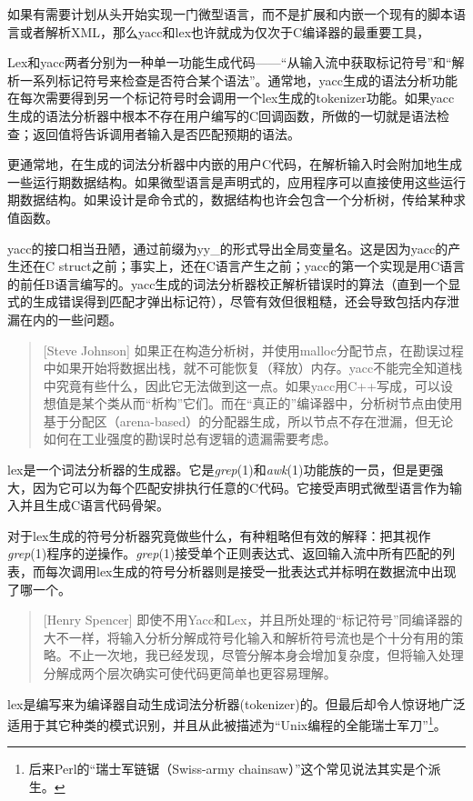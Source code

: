 \documentclass[12pt,oneside]{book}
\begin{document}
如果有需要计划从头开始实现一门微型语言，而不是扩展和内嵌一个现有的脚本语言或者解析XML，那么yacc和lex也许就成为仅次于C编译器的最重要工具，

Lex和yacc两者分别为一种单一功能生成代码——“从输入流中获取标记符号”和“解析一系列标记符号来检查是否符合某个语法”。通常地，yacc生成的语法分析功能在每次需要得到另一个标记符号时会调用一个lex生成的tokenizer功能。如果yacc生成的语法分析器中根本不存在用户编写的C回调函数，所做的一切就是语法检查；返回值将告诉调用者输入是否匹配预期的语法。

更通常地，在生成的词法分析器中内嵌的用户C代码，在解析输入时会附加地生成一些运行期数据结构。如果微型语言是声明式的，应用程序可以直接使用这些运行期数据结构。如果设计是命令式的，数据结构也许会包含一个分析树，传给某种求值函数。

yacc的接口相当丑陋，通过前缀为yy\_{}的形式导出全局变量名。这是因为yacc的产生还在C struct之前；事实上，还在C语言产生之前；yacc的第一个实现是用C语言的前任B语言编写的。yacc生成的词法分析器校正解析错误时的算法（直到一个显式的生成错误得到匹配才弹出标记符），尽管有效但很粗糙，还会导致包括内存泄漏在内的一些问题。

\begin{quote}[Steve Johnson]
如果正在构造分析树，并使用malloc分配节点，在勘误过程中如果开始将数据出栈，就不可能恢复（释放）内存。yacc不能完全知道栈中究竟有些什么，因此它无法做到这一点。如果yacc用C++写成，可以设想值是某个类从而“析构”它们。而在“真正的”编译器中，分析树节点由使用基于分配区（arena-based）的分配器生成，所以节点不存在泄漏，但无论如何在工业强度的勘误时总有逻辑的遗漏需要考虑。
\end{quote}

lex是一个词法分析器的生成器。它是\textit{grep}(1)和\textit{awk}(1)功能族的一员，但是更强大，因为它可以为每个匹配安排执行任意的C代码。它接受声明式微型语言作为输入并且生成C语言代码骨架。

对于lex生成的符号分析器究竟做些什么，有种粗略但有效的解释：把其视作\textit{grep}(1)程序的逆操作。\textit{grep}(1)接受单个正则表达式、返回输入流中所有匹配的列表，而每次调用lex生成的符号分析器则是接受一批表达式并标明在数据流中出现了哪一个。

\begin{quote}[Henry Spencer]
即使不用Yacc和Lex，并且所处理的“标记符号”同编译器的大不一样，将输入分析分解成符号化输入和解析符号流也是个十分有用的策略。不止一次地，我已经发现，尽管分解本身会增加复杂度，但将输入处理分解成两个层次确实可使代码更简单也更容易理解。
\end{quote}

lex是编写来为编译器自动生成词法分析器(tokenizer)的。但最后却令人惊讶地广泛适用于其它种类的模式识别，并且从此被描述为“Unix编程的全能瑞士军刀”\footnote{后来Perl的“瑞士军链锯（Swiss-army chainsaw）”这个常见说法其实是个派生。}。
\end{document}
